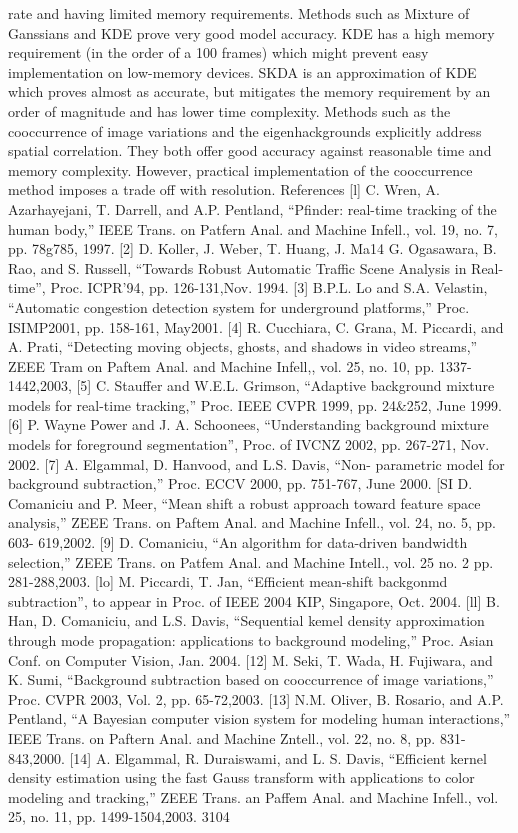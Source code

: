 rate
and
having limited memory requirements.
Methods
such
as
Mixture
of
Ganssians
and
KDE
prove
very
good
model
accuracy. KDE has a high
memory
requirement (in
the order
of
a
100
frames)
which
might prevent easy
implementation
on
low-memory
devices.
SKDA is
an
approximation
of
KDE
which
proves
almost
as
accurate,
but
mitigates
the
memory requirement
by
an
order of
magnitude
and
has
lower time complexity.
Methods
such
as the
cooccurrence
of
image variations and
the
eigenhackgrounds explicitly address
spatial
correlation.
They
both offer
good
accuracy against reasonable
time
and
memory complexity.
However,
practical
implementation
of the cooccurrence
method
imposes a
trade
off with
resolution.
References
[l]
C.
Wren,
A.
Azarhayejani,
T.
Darrell, and
A.P.
Pentland, “Pfinder: real-time tracking
of
the human
body,”
IEEE
Trans.
on
Patfern
Anal.
and
Machine
Infell.,
vol.
19,
no.
7,
pp.
78g785,
1997.
[2]
D.
Koller,
J.
Weber,
T.
Huang,
J.
Ma14
G.
Ogasawara,
B.
Rao,
and
S.
Russell,
“Towards Robust
Automatic
Traffic
Scene Analysis in Real-time”,
Proc.
ICPR’94,
pp.
126-131,Nov.
1994.
[3]
B.P.L.
Lo
and
S.A. Velastin, “Automatic congestion
detection system
for
underground
platforms,” Proc.
ISIMP2001,
pp.
158-161,
May2001.
[4]
R.
Cucchiara,
C.
Grana,
M.
Piccardi,
and A.
Prati,
“Detecting
moving
objects, ghosts,
and shadows
in
video
streams,”
ZEEE
Tram
on
Paftem
Anal.
and
Machine
Infell,,
vol. 25,
no.
10, pp.
1337-1442,2003,
[5] C. Stauffer
and
W.E.L.
Grimson, “Adaptive
background
mixture
models
for real-time tracking,” Proc.
IEEE
CVPR 1999, pp.
24&252,
June
1999.
[6]
P.
Wayne
Power and
J.
A.
Schoonees,
“Understanding
background
mixture
models
for
foreground segmentation”,
Proc.
of
IVCNZ
2002,
pp.
267-271,
Nov.
2002.
[7] A.
Elgammal,
D.
Hanvood,
and
L.S.
Davis,
“Non-
parametric
model
for
background
subtraction,” Proc.
ECCV 2000,
pp.
751-767,
June 2000.
[SI
D.
Comaniciu
and
P.
Meer,
“Mean
shift
a robust
approach
toward
feature space analysis,”
ZEEE
Trans.
on
Paftem
Anal.
and
Machine
Infell.,
vol.
24,
no.
5,
pp.
603-
619,2002.
[9]
D. Comaniciu,
“An
algorithm for data-driven
bandwidth selection,”
ZEEE
Trans.
on
Patfem
Anal.
and
Machine
Intell.,
vol.
25
no.
2
pp.
281-288,2003.
[lo]
M.
Piccardi,
T.
Jan, “Efficient mean-shift
backgonmd subtraction”,
to
appear
in
Proc. of
IEEE 2004
KIP,
Singapore, Oct. 2004.
[ll]
B.
Han,
D. Comaniciu,
and
L.S.
Davis, “Sequential
kemel density approximation
through mode propagation:
applications
to background
modeling,”
Proc.
Asian Conf.
on
Computer
Vision,
Jan.
2004.
[12]
M.
Seki,
T.
Wada,
H.
Fujiwara,
and
K.
Sumi,
“Background
subtraction
based
on
cooccurrence of
image
variations,” Proc.
CVPR
2003, Vol.
2,
pp.
65-72,2003.
[13]
N.M.
Oliver,
B.
Rosario,
and
A.P. Pentland,
“A
Bayesian
computer
vision
system
for modeling human
interactions,”
IEEE Trans.
on
Paftern
Anal. and
Machine
Zntell.,
vol. 22, no.
8,
pp.
831-843,2000.
[14] A.
Elgammal,
R.
Duraiswami,
and
L.
S.
Davis,
“Efficient kernel density estimation using
the
fast
Gauss
transform with applications
to
color
modeling and
tracking,”
ZEEE
Trans. an
Paffem
Anal.
and
Machine
Infell.,
vol.
25,
no. 11, pp.
1499-1504,2003.
3104





